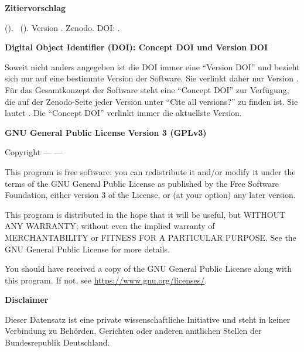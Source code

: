 \vspace{0.5cm}

\textbf{Zitiervorschlag}

\emph{\projectauthor} (\the\year ). \softwaretitle\ (\softwareshort ). Version \version . Zenodo. DOI: \softwareversiondoi .


\vspace{0.5cm}

\textbf{Digital Object Identifier (DOI): Concept DOI und Version DOI}

Soweit nicht anders angegeben ist die DOI immer eine \enquote{Version DOI} und bezieht sich nur auf eine bestimmte Version der Software. Sie verlinkt daher nur Version \version . Für das Gesamtkonzept der Software steht eine \enquote{Concept DOI} zur Verfügung, die auf der Zenodo-Seite jeder Version unter \enquote{Cite all versions?} zu finden ist.   Sie lautet \softwareconceptdoi . Die \enquote{Concept DOI} verlinkt immer die aktuellste Version.

\vspace{0.5cm}


\textbf{GNU General Public License Version 3 (GPLv3)}

Copyright --- \the\year --- \projectauthor

This program is free software: you can redistribute it and/or modify it under the terms of the GNU General Public License as published by the Free Software Foundation, either version 3 of the License, or (at your option) any later version.

This program is distributed in the hope that it will be useful, but WITHOUT ANY WARRANTY; without even the implied warranty of MERCHANTABILITY or FITNESS FOR A PARTICULAR PURPOSE.  See the GNU General Public License for more details.

You should have received a copy of the GNU General Public License along with this program.  If not, see \url{https://www.gnu.org/licenses/}.


\vspace{0.5cm}

\textbf{Disclaimer} 

Dieser Datensatz ist eine private wissenschaftliche Initiative und steht in keiner Verbindung zu Behörden, Gerichten oder anderen amtlichen Stellen der Bundesrepublik Deutschland.

\newpage
